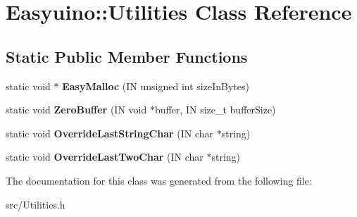 \hypertarget{class_easyuino_1_1_utilities}{}\section{Easyuino\+:\+:Utilities Class Reference}
\label{class_easyuino_1_1_utilities}
\subsection*{Static Public Member Functions}
\begin{DoxyCompactItemize}
\item 
\mbox{\label{class_easyuino_1_1_utilities_a5a7991900cbc3f9e4cda1289ee7a7ee1}} 
static void $\ast$ {\bfseries Easy\+Malloc} (IN unsigned int size\+In\+Bytes)
\item 
\mbox{\label{class_easyuino_1_1_utilities_a736bd038601132c4beac24cd88340695}} 
static void {\bfseries Zero\+Buffer} (IN void $\ast$buffer, IN size\+\_\+t buffer\+Size)
\item 
\mbox{\label{class_easyuino_1_1_utilities_a4d7f4573ee544e72da2945f18d043704}} 
static void {\bfseries Override\+Last\+String\+Char} (IN char $\ast$string)
\item 
\mbox{\label{class_easyuino_1_1_utilities_a8f5da1e6939a43f10702b16c2fdeb8e0}} 
static void {\bfseries Override\+Last\+Two\+Char} (IN char $\ast$string)
\end{DoxyCompactItemize}


The documentation for this class was generated from the following file\+:\begin{DoxyCompactItemize}
\item 
src/Utilities.\+h\end{DoxyCompactItemize}
